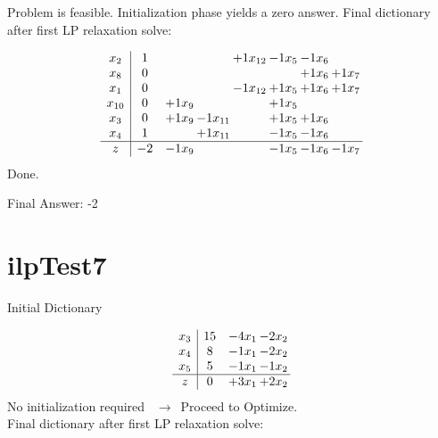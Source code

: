 \documentclass[11pt]{article}
\begin{document}
 Problem is feasible. Initialization phase yields a zero answer. 
Final dictionary after first LP relaxation solve: 

\[\begin{array}{c| c c@{\hskip 2pt} c@{\hskip 2pt} c@{\hskip 2pt} c@{\hskip 2pt} c@{\hskip 2pt} c@{\hskip 2pt} }
 x_{2}   &  1  &    &   & + 1 x_{12} & -1 x_{5} & -1 x_{6} &   \\
 x_{8}   &  0  &    &    &    &   & + 1 x_{6} & + 1 x_{7}\\
 x_{1}   &  0  &    &   & -1 x_{12} & + 1 x_{5} & + 1 x_{6} & + 1 x_{7}\\
 x_{10}   &  0 & + 1 x_{9} &    &   & + 1 x_{5} &    &   \\
 x_{3}   &  0 & + 1 x_{9} & -1 x_{11} &   & + 1 x_{5} & + 1 x_{6} &   \\
 x_{4}   &  1  &   & + 1 x_{11} &   & -1 x_{5} & -1 x_{6} &   \\
\hline
z    &  -2 & -1 x_{9} &    &   & -1 x_{5} & -1 x_{6} & -1 x_{7}\\
\end{array}\]
Done.

Final Answer: -2

\section{ilpTest7}

Initial Dictionary 

\[\begin{array}{c| c c@{\hskip 2pt} c@{\hskip 2pt} }
 x_{3}   &  15 & -4 x_{1} & -2 x_{2}\\
 x_{4}   &  8 & -1 x_{1} & -2 x_{2}\\
 x_{5}   &  5 & -1 x_{1} & -1 x_{2}\\
\hline
z    &  0 & + 3 x_{1} & + 2 x_{2}\\
\end{array}\]
No initialization required \ $\rightarrow$\  Proceed to Optimize. \\ 
Final dictionary after first LP relaxation solve: 
\end{document}
